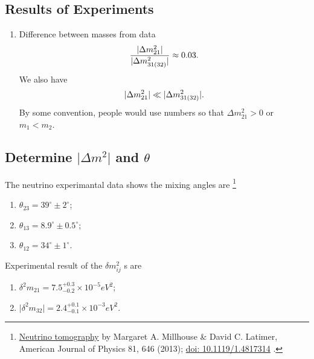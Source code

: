 \documentclass[letterpaper,12pt,english]{sphinxmanual}
\begin{document}
\subsection{Results of Experiments}
\label{oscillations:results-of-experiments}\begin{enumerate}
\item {} 
Difference between masses from data
\begin{gather}
\begin{split}\frac{\lvert \Delta m_{21}^2 \rvert}{\lvert \Delta m_{31(32)}^2 \rvert} \approx 0.03 .\end{split}\notag
\end{gather}
We also have
\begin{gather}
\begin{split}\lvert\Delta m_{21}^2 \rvert \ll \lvert \Delta m_{31(32)}^2 \rvert.\end{split}\notag
\end{gather}
By some convention, people would use numbers so that \(\Delta m_{21}^2 > 0\) or \(m_1 < m_2\).

\end{enumerate}


\subsection{Determine \(\vert\Delta m^2\vert\) and \(\theta\)}
\label{oscillations:determine-and}
The neutrino experimantal data shows the mixing angles are \footnote{
\href{http://scitation.aip.org/docserver/fulltext/aapt/journal/ajp/81/9/1.4817314.pdf?expires=1404757170\&id=id\&accname=389573\&checksum=665C4B4FC4EA96902216439ECF5AC17D}{Neutrino tomography} by Margaret A. Millhouse \& David C. Latimer, American Journal of Physics 81, 646 (2013); \href{http://dx.doi.org/10.1119/1.4817314}{doi: 10.1119/1.4817314} .
}
\begin{enumerate}
\item {} 
\(\theta_{23}=39^{\circ}\pm 2 ^{\circ}\);

\item {} 
\(\theta_{13}=8.9^{\circ}\pm 0.5^{\circ}\);

\item {} 
\(\theta_{12}=34^{\circ}\pm 1^{\circ}\).

\end{enumerate}

Experimental result of the \(\delta m^2 _{ij}\) s are \footnotemark[1]
\begin{enumerate}
\item {} 
\(\delta^2 m_{21}=7.5^{+0.3}_{-0.2}\times 10^{-5}eV^2\);

\item {} 
\(\lvert\delta^2 m_{32}\rvert =2.4^{+0.1}_{-0.1}\times 10^{-3}eV^2\).

\end{enumerate}
\end{document}

